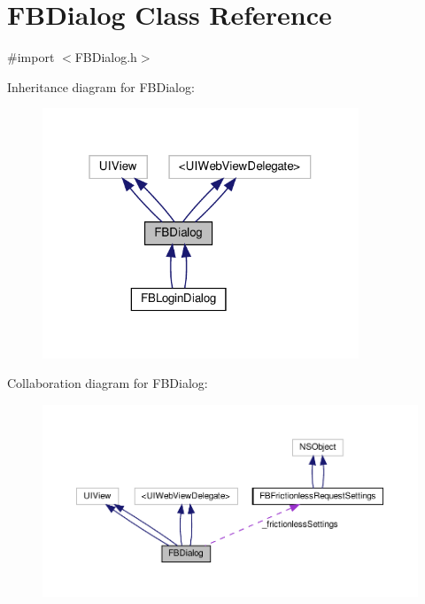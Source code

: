 \hypertarget{interfaceFBDialog}{}\section{F\+B\+Dialog Class Reference}
\label{interfaceFBDialog}


{\ttfamily \#import $<$F\+B\+Dialog.\+h$>$}



Inheritance diagram for F\+B\+Dialog\+:
\nopagebreak
\begin{figure}[H]
\begin{center}
\leavevmode
\includegraphics[width=268pt]{interfaceFBDialog__inherit__graph}
\end{center}
\end{figure}


Collaboration diagram for F\+B\+Dialog\+:
\nopagebreak
\begin{figure}[H]
\begin{center}
\leavevmode
\includegraphics[width=350pt]{interfaceFBDialog__coll__graph}
\end{center}
\end{figure}
